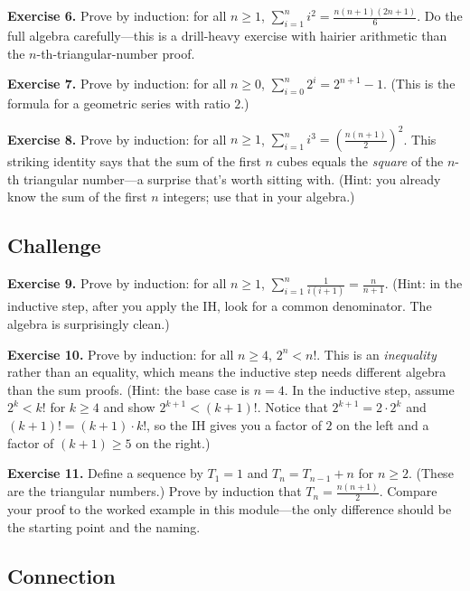 \documentclass[11pt]{article}
\begin{document}
\bigskip
\textbf{Exercise 6.}\label{ex:m8:6} Prove by induction: for all $n \geq 1$, $\displaystyle\sum_{i=1}^{n} i^2 = \frac{n(n+1)(2n+1)}{6}$. Do the full algebra carefully---this is a drill-heavy exercise with hairier arithmetic than the $n$-th-triangular-number proof.

\bigskip
\textbf{Exercise 7.}\label{ex:m8:7} Prove by induction: for all $n \geq 0$, $\displaystyle\sum_{i=0}^{n} 2^i = 2^{n+1} - 1$. (This is the formula for a geometric series with ratio $2$.)

\bigskip
\textbf{Exercise 8.}\label{ex:m8:8} Prove by induction: for all $n \geq 1$, $\displaystyle\sum_{i=1}^{n} i^3 = \left(\frac{n(n+1)}{2}\right)^2$. This striking identity says that the sum of the first $n$ cubes equals the \emph{square} of the $n$-th triangular number---a surprise that's worth sitting with. (Hint: you already know the sum of the first $n$ integers; use that in your algebra.)

\subsection*{Challenge}

\textbf{Exercise 9.}\label{ex:m8:9} Prove by induction: for all $n \geq 1$, $\displaystyle\sum_{i=1}^{n} \frac{1}{i(i+1)} = \frac{n}{n+1}$. (Hint: in the inductive step, after you apply the IH, look for a common denominator. The algebra is surprisingly clean.)

\bigskip
\textbf{Exercise 10.}\label{ex:m8:10} Prove by induction: for all $n \geq 4$, $2^n < n!$. This is an \emph{inequality} rather than an equality, which means the inductive step needs different algebra than the sum proofs. (Hint: the base case is $n = 4$. In the inductive step, assume $2^k < k!$ for $k \geq 4$ and show $2^{k+1} < (k+1)!$. Notice that $2^{k+1} = 2 \cdot 2^k$ and $(k+1)! = (k+1) \cdot k!$, so the IH gives you a factor of $2$ on the left and a factor of $(k+1) \geq 5$ on the right.)

\bigskip
\textbf{Exercise 11.}\label{ex:m8:11} Define a sequence by $T_1 = 1$ and $T_n = T_{n-1} + n$ for $n \geq 2$. (These are the triangular numbers.) Prove by induction that $T_n = \frac{n(n+1)}{2}$. Compare your proof to the worked example in this module---the only difference should be the starting point and the naming.

\subsection*{Connection}
\end{document}

